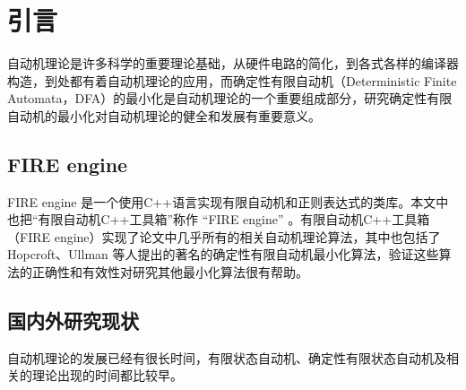 \chapter{引言}
自动机理论是许多科学的重要理论基础，从硬件电路的简化，到各式各样的编译器构造，到处都有着自动机理论的应用，而确定性有限自动机（Deterministic Finite Automata，DFA）的最小化是自动机理论的一个重要组成部分，研究确定性有限自动机的最小化对自动机理论的健全和发展有重要意义。

\section{FIRE engine}
FIRE engine \cite{watson1994design}是一个使用C++语言实现有限自动机和正则表达式的类库。本文中也把“有限自动机C++工具箱”称作 “FIRE engine” 。有限自动机C++工具箱（FIRE engine）实现了论文\cite{watson1993taxonomya,watson1993taxonomyb}中几乎所有的相关自动机理论算法，其中也包括了 Hopcroft、Ullman 等人提出的著名的确定性有限自动机最小化算法，验证这些算法的正确性和有效性对研究其他最小化算法很有帮助。

\section{国内外研究现状}

自动机理论的发展已经有很长时间，有限状态自动机、确定性有限状态自动机及相关的理论出现的时间都比较早。